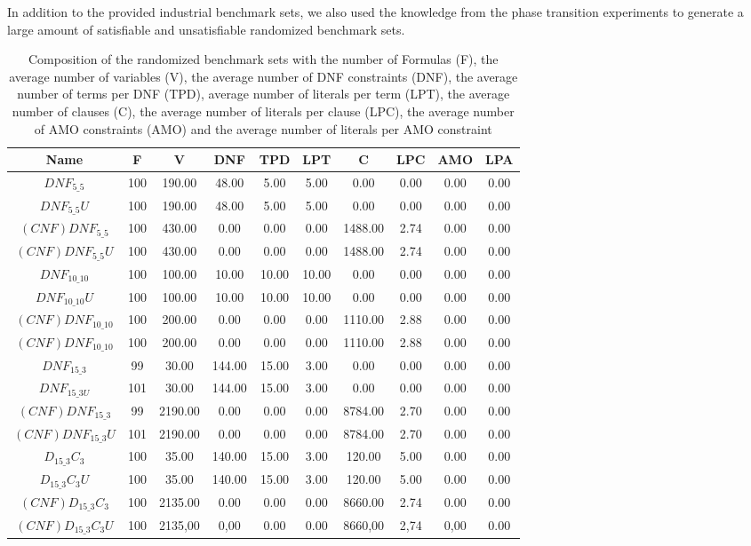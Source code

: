 In addition to the provided industrial benchmark sets, we also used the knowledge from the phase transition experiments to generate a large amount of satisfiable and unsatisfiable randomized benchmark sets.

\begin{table}[!htb]
\centering
\caption[Composition of the randomized benchmark sets]{Composition of the randomized benchmark sets with the number of Formulas (F), the average number of variables (V), the average number of DNF constraints (DNF), the average number of terms per DNF (TPD), average number of literals per term (LPT), the average number of clauses (C), the average number of literals per clause (LPC), the average number of AMO constraints (AMO) and the average number of literals per AMO constraint}
\label{tab:randomizedBenchmarks}
\begin{tabular}{|c|c|c|c|c|c|c|c|c|c|}
\hline
Name & F & V & DNF & TPD & LPT & C & LPC & AMO & LPA \\
\hline
$DNF_{5\_5}$ & 100 & 190.00 & 48.00 & 5.00 & 5.00 & 0.00 & 0.00 & 0.00 & 0.00 \\ 
 \hline 
$DNF_{5\_5}U$ & 100 & 190.00 & 48.00 & 5.00 & 5.00 & 0.00 & 0.00 & 0.00 & 0.00 \\ 
 \hline 
$(CNF)DNF_{5\_5}$ & 100 & 430.00 & 0.00 & 0.00 & 0.00 & 1488.00 & 2.74 & 0.00 & 0.00 \\ 
 \hline 
$(CNF)DNF_{5\_5}U$ & 100 & 430.00 & 0.00 & 0.00 & 0.00 & 1488.00 & 2.74 & 0.00 & 0.00 \\ 
 \hline 
 $DNF_{10\_10}$ & 100 & 100.00 & 10.00 & 10.00 & 10.00 & 0.00 & 0.00 & 0.00 & 0.00 \\ 
 \hline 
$DNF_{10\_10}U$ & 100 & 100.00 & 10.00 & 10.00 & 10.00 & 0.00 & 0.00 & 0.00 & 0.00 \\ 
 \hline 
$(CNF)DNF_{10\_10}$ & 100 & 200.00 & 0.00 & 0.00 & 0.00 & 1110.00 & 2.88 & 0.00 & 0.00 \\ 
 \hline 
$(CNF)DNF_{10\_10}$ & 100 & 200.00 & 0.00 & 0.00 & 0.00 & 1110.00 & 2.88 & 0.00 & 0.00 \\ 
\hline
$DNF_{15\_3}$ & 99 & 30.00 & 144.00 & 15.00 & 3.00 & 0.00 & 0.00 & 0.00 & 0.00 \\ 
 \hline 
$DNF_{15\_3U}$ & 101 & 30.00 & 144.00 & 15.00 & 3.00 & 0.00 & 0.00 & 0.00 & 0.00 \\ 
 \hline 
$(CNF)DNF_{15\_3}$ & 99 & 2190.00 & 0.00 & 0.00 & 0.00 & 8784.00 & 2.70 & 0.00 & 0.00 \\ 
 \hline 
$(CNF)DNF_{15\_3}U$ & 101 & 2190.00 & 0.00 & 0.00 & 0.00 & 8784.00 & 2.70 & 0.00 & 0.00 \\ 
 \hline
$D_{15\_3}C_3$ & 100 & 35.00 & 140.00 & 15.00 & 3.00 & 120.00 & 5.00 & 0.00 & 0.00 \\ 
 \hline 
$D_{15\_3}C_3U$ & 100 & 35.00 & 140.00 & 15.00 & 3.00 & 120.00 & 5.00 & 0.00 & 0.00 \\ 
 \hline 
$(CNF)D_{15\_3}C_3$ & 100 & 2135.00 & 0.00 & 0.00 & 0.00 & 8660.00 & 2.74 & 0.00 & 0.00 \\ 
 \hline 
$(CNF)D_{15\_3}C_3U$ & 100 & 2135,00 & 0,00 & 0.00 & 0.00 & 8660,00 & 2,74 & 0,00 & 0.00 \\ 
 \hline 
\end{tabular}
\end{table}

